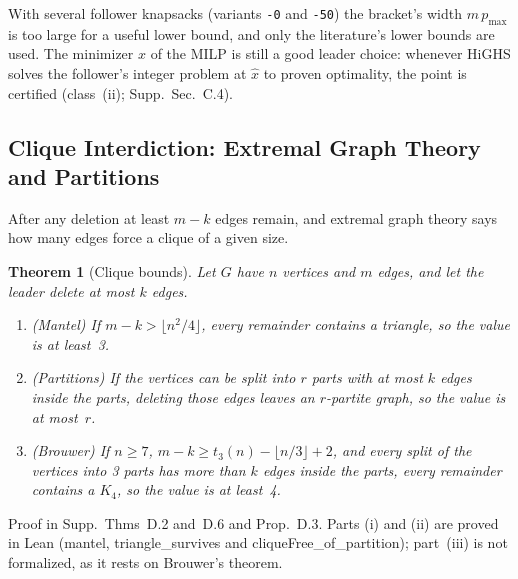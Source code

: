 \documentclass[]{spie}  %
\theoremstyle{plain}
\newtheorem{thm}{Theorem}
\newcommand{\supp}[1]{Supp.\ Sec.~#1}
\newcommand{\lean}[1]{\mbox{\ttfamily #1}}   %
\newcommand{\code}[1]{\texttt{#1}}
\newcommand{\pmax}{p_{\max}}
\newcommand{\cls}[1]{class~(#1)}             %
\begin{document}
With several follower knapsacks (variants \code{-0} and \code{-50}) the bracket's width
$m\,\pmax$ is too large for a useful lower bound, and only the literature's lower bounds are used.
The minimizer $\hat x$ of the MILP is still a good leader choice: whenever HiGHS solves the
follower's integer problem at $\hat x$ to proven optimality, the point is certified (\cls{ii};
\supp{C.4}).

\subsection{Clique Interdiction: Extremal Graph Theory and Partitions}\label{sec:clique}

After any deletion at least $m-k$ edges remain, and extremal graph theory says how many edges
force a clique of a given size.

\begin{thm}[Clique bounds]\label{thm:clique}
Let $G$ have $n$ vertices and $m$ edges, and let the leader delete at most $k$ edges.
\begin{enumerate}
\item[(i)] (Mantel\cite{mantel1907problem}) If $m-k>\lfloor n^2/4\rfloor$, every remainder contains
a triangle, so the value is at least~3.
\item[(ii)] (Partitions) If the vertices can be split into $r$ parts with at most $k$ edges
inside the parts, deleting those edges leaves an $r$-partite graph, so the value is at most~$r$.
\item[(iii)] (Brouwer\cite{brouwer1981lotto,tyomkyn2015strong}) If $n\ge 7$,
$m-k\ge t_3(n)-\lfloor n/3\rfloor+2$, and every split of the vertices into 3 parts has more than
$k$ edges inside the parts, every remainder contains a $K_4$, so the value is at least~4.
\end{enumerate}
\end{thm}
\noindent Proof in Supp.\ Thms~D.2 and~D.6 and Prop.~D.3. Parts (i) and (ii) are proved in Lean
(\lean{mantel}, \lean{triangle\_survives} and \lean{cliqueFree\_of\_partition}); part~(iii) is
not formalized, as it rests on Brouwer's theorem.
\end{document}
